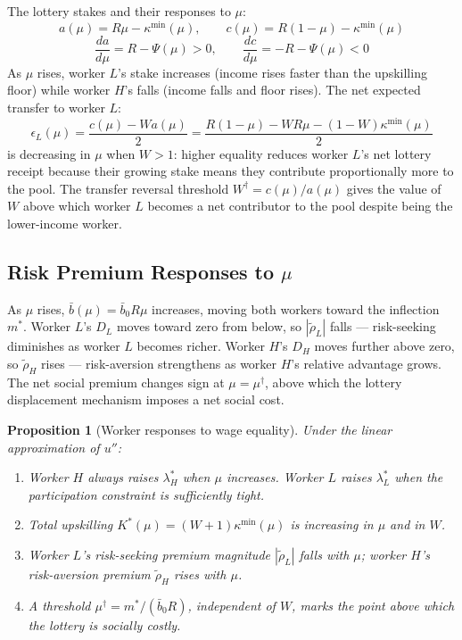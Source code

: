 \documentclass[12pt,a4paper]{article}
\newtheorem{proposition}{Proposition}
\begin{document}
The lottery stakes and their responses to $\mu$:
\begin{equation}
  a(\mu) = R\mu - \kappa^{\min}(\mu), \qquad
  c(\mu) = R(1-\mu) - \kappa^{\min}(\mu)
  \label{eq:stakes}
\end{equation}
\begin{equation}
  \frac{da}{d\mu} = R - \Psi(\mu) > 0,
  \qquad
  \frac{dc}{d\mu} = -R - \Psi(\mu) < 0
  \label{eq:dstakes}
\end{equation}
As $\mu$ rises, worker $L$'s stake increases (income rises faster than
the upskilling floor) while worker $H$'s falls (income falls and floor
rises). The net expected transfer to worker $L$:
\begin{equation}
  \epsilon_L(\mu) = \frac{c(\mu) - Wa(\mu)}{2}
  = \frac{R(1-\mu) - WR\mu - (1-W)\kappa^{\min}(\mu)}{2}
  \label{eq:transfer_mu}
\end{equation}
is decreasing in $\mu$ when $W > 1$: higher equality reduces worker
$L$'s net lottery receipt because their growing stake means they
contribute proportionally more to the pool. The transfer reversal
threshold $W^\dagger = c(\mu)/a(\mu)$ gives the value of $W$ above
which worker $L$ becomes a net contributor to the pool despite being
the lower-income worker.

\subsection{Risk Premium Responses to $\mu$}

As $\mu$ rises, $\bar{b}(\mu) = \bar{b}_0 R\mu$ increases, moving
both workers toward the inflection $m^*$. Worker $L$'s $D_L$ moves
toward zero from below, so $|\tilde\rho_L|$ falls --- risk-seeking
diminishes as worker $L$ becomes richer. Worker $H$'s $D_H$ moves
further above zero, so $\tilde\rho_H$ rises --- risk-aversion
strengthens as worker $H$'s relative advantage grows. The net social
premium changes sign at $\mu = \mu^\dagger$, above which the
lottery displacement mechanism imposes a net social cost.

\begin{proposition}[Worker responses to wage equality]
\label{prop:worker_responses}
Under the linear approximation of $u''$:
\begin{enumerate}
  \item Worker $H$ always raises $\lambda_H^*$ when $\mu$ increases.
        Worker $L$ raises $\lambda_L^*$ when the participation
        constraint is sufficiently tight.
  \item Total upskilling $K^*(\mu) = (W+1)\kappa^{\min}(\mu)$ is
        increasing in $\mu$ and in $W$.
  \item Worker $L$'s risk-seeking premium magnitude $|\tilde\rho_L|$
        falls with $\mu$; worker $H$'s risk-aversion premium
        $\tilde\rho_H$ rises with $\mu$.
  \item A threshold $\mu^\dagger = m^*/(\bar{b}_0 R)$, independent of
        $W$, marks the point above which the lottery is socially costly.
\end{enumerate}
\end{proposition}
\end{document}
